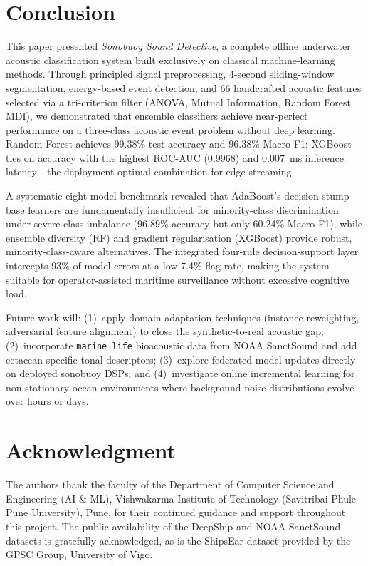 \documentclass[conference]{IEEEtran}
\begin{document}
\section{Conclusion}
\label{sec:conc}

This paper presented \textit{Sonobuoy Sound Detective}, a complete offline underwater acoustic classification system built exclusively on classical machine-learning methods. Through principled signal preprocessing, 4-second sliding-window segmentation, energy-based event detection, and 66 handcrafted acoustic features selected via a tri-criterion filter (ANOVA, Mutual Information, Random Forest MDI), we demonstrated that ensemble classifiers achieve near-perfect performance on a three-class acoustic event problem without deep learning. Random Forest achieves 99.38\% test accuracy and 96.38\% Macro-F1; XGBoost ties on accuracy with the highest ROC-AUC (0.9968) and 0.007~ms inference latency---the deployment-optimal combination for edge streaming.

A systematic eight-model benchmark revealed that AdaBoost's decision-stump base learners are fundamentally insufficient for minority-class discrimination under severe class imbalance (96.89\% accuracy but only 60.24\% Macro-F1), while ensemble diversity (RF) and gradient regularisation (XGBoost) provide robust, minority-class-aware alternatives. The integrated four-rule decision-support layer intercepts 93\% of model errors at a low 7.4\% flag rate, making the system suitable for operator-assisted maritime surveillance without excessive cognitive load.

Future work will: (1)~apply domain-adaptation techniques (instance reweighting, adversarial feature alignment) to close the synthetic-to-real acoustic gap; (2)~incorporate \texttt{marine\_life} bioacoustic data from NOAA SanctSound and add cetacean-specific tonal descriptors; (3)~explore federated model updates directly on deployed sonobuoy DSPs; and (4)~investigate online incremental learning for non-stationary ocean environments where background noise distributions evolve over hours or days.

\section*{Acknowledgment}

The authors thank the faculty of the Department of Computer Science and Engineering (AI \& ML), Vishwakarma Institute of Technology (Savitribai Phule Pune University), Pune, for their continued guidance and support throughout this project. The public availability of the DeepShip and NOAA SanctSound datasets is gratefully acknowledged, as is the ShipsEar dataset provided by the GPSC Group, University of Vigo.
\end{document}
